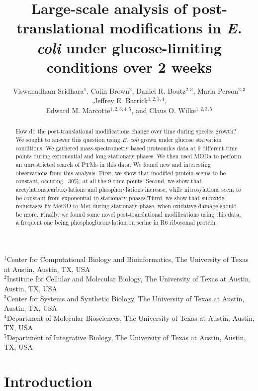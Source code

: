 \documentclass[12pt]{article}
\begin{document}
\title{Large-scale analysis of post-translational modifications in \emph{E. coli} under glucose-limiting conditions over 2 weeks}

\author{Viswanadham Sridhara$^1$, Colin Brown$^{2}$, Daniel R. Boutz$^{2,3}$, Maria Person$^{2,3}$,Jeffrey E. Barrick$^{1,2,3,4}$,\\
Edward M. Marcotte$^{1,2,3,4,5}$, and Claus O. Wilke$^{1,2,3,5}$}
\maketitle

\noindent
$^1$Center for Computational Biology and Bioinformatics, The University of Texas at Austin, Austin, TX, USA\\
$^2$Institute for Cellular and Molecular Biology, The University of Texas at Austin, Austin, TX, USA\\
$^3$Center for Systems and Synthetic Biology, The University of Texas at Austin, Austin, TX, USA\\
$^4$Department of Molecular Biosciences, The University of Texas at Austin, Austin, TX, USA\\
$^5$Department of Integrative Biology, The University of Texas at Austin, Austin, TX, USA\\


\begin{abstract}
How do the post-translational modifications change over time during species growth? We sought to answer this question using \emph{E. coli} grown under glucose starvation conditions. We gathered mass-spectrometry based proteomics data at 9 different time points during exponential and long stationary phases. We then used MODa to perform an unrestricted search of PTMs in this data. We found new and interesting observations from this analysis. First, we show that modified protein seems to be constant, occuring ~30\%, at all the 9 time points. Second, we show that acetylations,carboxylations and phosphorylations increase, while nitrosylations seem to be constant from exponential to stationary phases.Third, we show that sulfoxide reductases fix MetSO to Met during stationary phase, when oxidative damage should be more. Finally, we found some novel post-translational modifications using this data, a frequent one being phosphogluconylation on serine in R6 ribosomal protein.
\end{abstract}


\section{Introduction}
\end{document}
